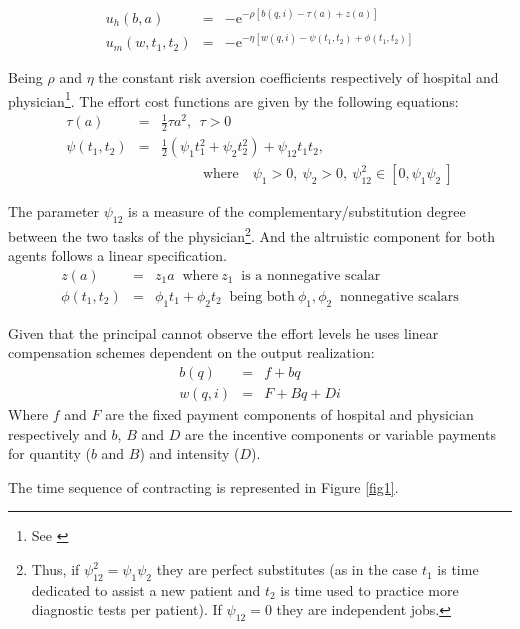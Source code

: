 \documentclass[12pt,letterpaper]{article}
\newcommand{\e}{\mathrm{e}}
\begin{document}
\begin{eqnarray*}
  u_h(b,a) &=& -\e^{-\rho[b(q,i)-\tau(a)+z(a)]} \\
  u_m(w,t_1,t_2) &=& -\e^{-\eta[w(q,i)-\psi(t_1,t_2)+\phi(t_1,t_2)]}
\end{eqnarray*}

Being $\rho$ and $\eta$ the constant risk aversion coefficients respectively of hospital and physician\footnote{See \cite{HolmstromMilgrom87}}.    The effort cost functions are given by the following equations:
\begin{eqnarray*}
  \tau(a) &=& \frac{1}{2}\tau a^2, \ \ \tau>0\\
  \psi(t_1,t_2) &=& \frac{1}{2}(\psi_1t_1^2+\psi_2t_2^2)+\psi_{12}t_1t_2,\\
&& \quad  \quad  \quad  \text{where} \quad \psi_1>0, \ \psi_2>0, \ \psi_{12}^2\in[0, \psi_1\psi_2 \ ]\nonumber
\end{eqnarray*}

The parameter $\psi_{12}$ is a measure of the complementary/substitution degree between the two tasks of the physician\footnote{Thus, if $\psi_{12}^2=\psi_1\psi_2$ they are perfect substitutes (as in the case $t_1$ is time dedicated to assist a new patient and $t_2$ is time used to practice more diagnostic tests per patient).  If $\psi_{12}=0$ they are independent jobs.}. And the altruistic component for both agents follows a linear specification.
\begin{eqnarray*}
  z(a) &=& z_1a \ \text{     where} \ z_1 \  \text{ is a nonnegative scalar} \\
  \phi(t_1,t_2) &=& \phi_1t_1+\phi_2t_2 \ \text{    being both} \ \phi_1, \phi_2 \
\text{ nonnegative scalars}
\end{eqnarray*}

Given that the principal cannot observe the effort levels he uses  linear compensation schemes dependent on the output realization:
\begin{eqnarray*}
  b(q) &=& f+bq \\
  w(q,i) &=& F+Bq+Di
\end{eqnarray*}
 Where $f$ and $F$ are the fixed payment components of hospital and physician respectively and $b$, $B$ and $D$ are the incentive components or variable payments for quantity ($b$ and $B$) and intensity ($D$).


  The time sequence of contracting is represented in Figure \ref{fig1}.
\end{document}
